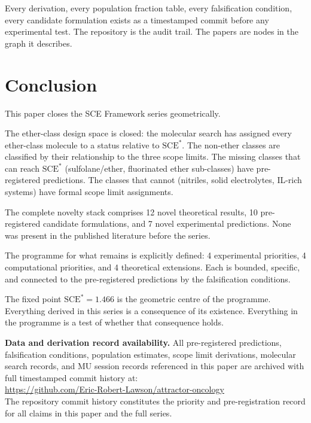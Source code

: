 \documentclass[11pt]{article}
\theoremstyle{plain}
\theoremstyle{definition}
\theoremstyle{remark}
\begin{document}
Every derivation, every population fraction table, every
falsification condition, every candidate formulation exists as
a timestamped commit before any experimental test.  The repository
is the audit trail.  The papers are nodes in the graph it describes.

\section{Conclusion}

This paper closes the SCE Framework series geometrically.

The ether-class design space is closed: the molecular search
has assigned every ether-class molecule to a status relative
to $\mathrm{SCE}^{*}$.  The non-ether classes are classified
by their relationship to the three scope limits.  The missing
classes that can reach $\mathrm{SCE}^{*}$ (sulfolane/ether,
fluorinated ether sub-classes) have pre-registered predictions.
The classes that cannot (nitriles, solid electrolytes, IL-rich
systems) have formal scope limit assignments.

The complete novelty stack comprises 12 novel theoretical
results, 10 pre-registered candidate formulations, and 7 novel
experimental predictions.  None was present in the published
literature before the series.

The programme for what remains is explicitly defined: 4
experimental priorities, 4 computational priorities, and 4
theoretical extensions.  Each is bounded, specific, and
connected to the pre-registered predictions by the falsification
conditions.

The fixed point $\mathrm{SCE}^{*} = 1.466$ is the geometric
centre of the programme.  Everything derived in this series
is a consequence of its existence.  Everything in the programme
is a test of whether that consequence holds.

\bigskip
\noindent\textbf{Data and derivation record availability.}
All pre-registered predictions, falsification conditions,
population estimates, scope limit derivations, molecular search
records, and MU session records referenced in this paper are
archived with full timestamped commit history at:\\
\url{https://github.com/Eric-Robert-Lawson/attractor-oncology}\\
The repository commit history constitutes the priority and
pre-registration record for all claims in this paper and
the full series.
\end{document}
